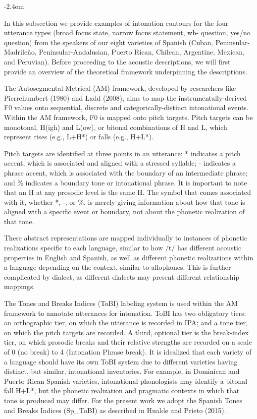 \documentclass[]{article}
\renewenvironment{quote}{\begin{fquote}\advance\leftmargini -2.4em\begin{oldquote}}{\end{oldquote}\end{fquote}}
\newenvironment{fquote}
  {\def\FrameCommand{
	\fboxsep=0.6em %
	\fcolorbox{black}{white}}%
    \MakeFramed {\advance\hsize-2\width \FrameRestore}
    \begin{minipage}{\linewidth}
  }
  {\end{minipage}\endMakeFramed}
\begin{document}
\begin{quote}
In this subsection we provide examples of intonation contours for the four utterance types (broad focus state, narrow focus statement, wh- question, yes/no question) from the speakers of our eight varieties of Spanish (Cuban, Peninsular-Madrileño, Peninsular-Andalusian, Puerto Rican, Chilean, Argentine, Mexican, and Peruvian).
Before proceeding to the acoustic descriptions, we will first provide an overview of the theoretical framework underpinning the descriptions.

The Autosegmental Metrical (AM) framework, developed by researchers like Pierrehumbert (1980) and Ladd (2008), aims to map the instrumentally-derived F0 values onto sequential, discrete and categorically-distinct intonational events.
Within the AM framework, F0 is mapped onto pitch targets.
Pitch targets can be monotonal, H(igh) and L(ow), or bitonal combinations of H and L, which represent rises (e.g., L+H*) or falls (e.g., H+L*).

Pitch targets are identified at three points in an utterance: * indicates a pitch accent, which is associated and aligned with a stressed syllable; - indicates a phrase accent, which is associated with the boundary of an intermediate phrase; and \% indicates a boundary tone or intonational phrase.
It is important to note that an H at any prosodic level is the same H.
The symbol that comes associated with it, whether *, -, or \%, is merely giving information about how that tone is aligned with a specific event or boundary, not about the phonetic realization of that tone.

These abstract representations are mapped individually to instances of phonetic realizations specific to each language, similar to how /t/ has different acoustic properties in English and Spanish, as well as different phonetic realizations within a language depending on the context, similar to allophones.
This is further complicated by dialect, as different dialects may present different relationship mappings.

The Tones and Breaks Indices (ToBI) labeling system is used within the AM framework to annotate utterances for intonation.
ToBI has two obligatory tiers: an orthographic tier, on which the utterance is recorded in IPA; and a tone tier, on which the pitch targets are recorded.
A third, optional tier is the break-index tier, on which prosodic breaks and their relative strengths are recorded on a scale of 0 (no break) to 4 (Intonation Phrase break).
It is idealized that each variety of a language should have its own ToBI system due to different varieties having distinct, but similar, intonational inventories.
For example, in Dominican and Puerto Rican Spanish varieties, intonational phonologists may identify a bitonal fall H+L*, but the phonetic realization and pragmatic contexts in which that tone is produced may differ.
For the present work we adopt the Spanish Tones and Breaks Indices (Sp\_ToBI) as described in Hualde and Prieto (2015).
\end{quote}
\end{document}
